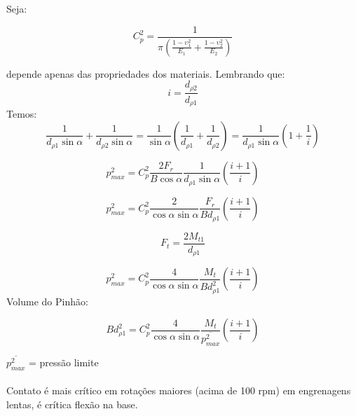 Seja: 

\[C_{p}^{2} = \frac{1}{\pi \left(  \frac{1-\upsilon_{1}^{2}}{E_{1}} + \frac{1-\upsilon_{2}^{2}}{E_{2}}  \right) }\]

depende apenas das propriedades dos materiais.
Lembrando que:
\[i = \frac{d_{\rho 2}}{d_{\rho 1}}\]
Temos:
\[
\frac{1}{d_{\rho 1}\sin \alpha} + \frac{1}{d_{\rho 2}\sin \alpha} = \frac{1}{\sin \alpha} \left(  \frac{1}{d_{\rho 1}} + \frac{1}{d_{\rho 2}}  \right) = \frac{1}{d_{\rho 1}\sin \alpha} \left(  1 + \frac{1}{i}  \right) \]

\[p_{max}^{2}=C_{p}^{2}\frac{2F_{r}}{B\cos \alpha} \frac{1}{d_{\rho 1} \sin \alpha} \left( \frac{i+1}{i}  \right)\]

\[p_{max}^{2}=C_{p}^{2}\frac{2}{\cos \alpha \sin \alpha} \frac{F_{r}}{B d_{\rho 1} } \left( \frac{i+1}{i}  \right)\]

\[F_{t} = \frac{2M_{t1}}{d_{\rho 1}}\]

\[p_{max}^{2}=C_{p}^{2}\frac{4}{\cos \alpha \sin \alpha} \frac{M_{t}}{B d_{\rho 1}^{2} } \left( \frac{i+1}{i}  \right)\]
Volume do Pinhão:

\[ B d_{\rho 1}^{2} =C_{p}^{2}\frac{4}{\cos \alpha \sin \alpha} \frac{M_{t}}{ \overline{p_{max}^{2}} } \left( \frac{i+1}{i}  \right)\]

$\overline{p_{max}^{2}}$ = pressão limite
\\
\\
Contato é mais crítico em rotações maiores (acima de 100 rpm) em engrenagens lentas, é crítica flexão na base.


